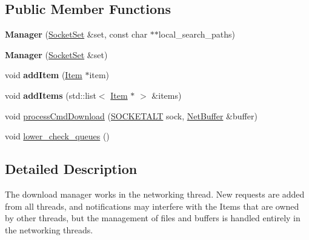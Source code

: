 \subsection*{Public Member Functions}
\begin{DoxyCompactItemize}
\item 
{\bfseries Manager} (\hyperlink{classSocketSet}{Socket\+Set} \&set, const char $\ast$$\ast$local\+\_\+search\+\_\+paths)\hypertarget{classVsnetDownload_1_1Client_1_1Manager_a23578a0fcb95262c2cb2630be835d35c}{}\label{classVsnetDownload_1_1Client_1_1Manager_a23578a0fcb95262c2cb2630be835d35c}

\item 
{\bfseries Manager} (\hyperlink{classSocketSet}{Socket\+Set} \&set)\hypertarget{classVsnetDownload_1_1Client_1_1Manager_ac462bdd8af365a96515bab80b134bed8}{}\label{classVsnetDownload_1_1Client_1_1Manager_ac462bdd8af365a96515bab80b134bed8}

\item 
void {\bfseries add\+Item} (\hyperlink{classVsnetDownload_1_1Client_1_1Item}{Item} $\ast$item)\hypertarget{classVsnetDownload_1_1Client_1_1Manager_a7f9523d1f89d819df1fb45a25db8c4a8}{}\label{classVsnetDownload_1_1Client_1_1Manager_a7f9523d1f89d819df1fb45a25db8c4a8}

\item 
void {\bfseries add\+Items} (std\+::list$<$ \hyperlink{classVsnetDownload_1_1Client_1_1Item}{Item} $\ast$ $>$ \&items)\hypertarget{classVsnetDownload_1_1Client_1_1Manager_a82b3bb836d823c42a8d2d59a7166a4db}{}\label{classVsnetDownload_1_1Client_1_1Manager_a82b3bb836d823c42a8d2d59a7166a4db}

\item 
void \hyperlink{classVsnetDownload_1_1Client_1_1Manager_ad60a6aeba39044e9bf6fd6fe5835111d}{process\+Cmd\+Download} (\hyperlink{classSOCKETALT}{S\+O\+C\+K\+E\+T\+A\+LT} sock, \hyperlink{classNetBuffer}{Net\+Buffer} \&buffer)
\item 
void \hyperlink{classVsnetDownload_1_1Client_1_1Manager_a3a4c303fd97ea28dbc5e169985f2c30e}{lower\+\_\+check\+\_\+queues} ()
\end{DoxyCompactItemize}


\subsection{Detailed Description}
The download manager works in the networking thread. New requests are added from all threads, and notifications may interfere with the Items that are owned by other threads, but the management of files and buffers is handled entirely in the networking threads. 

